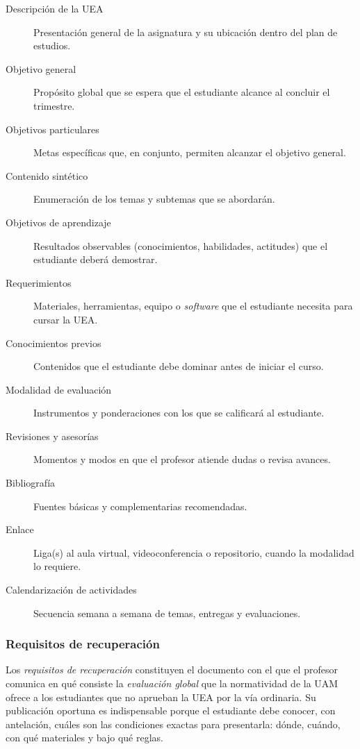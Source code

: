 \begin{description}
    \item[Descripción de la UEA] Presentación general de la asignatura y su ubicación dentro del plan de estudios.
    \item[Objetivo general] Propósito global que se espera que el estudiante alcance al concluir el trimestre.
    \item[Objetivos particulares] Metas específicas que, en conjunto, permiten alcanzar el objetivo general.
    \item[Contenido sintético] Enumeración de los temas y subtemas que se abordarán.
    \item[Objetivos de aprendizaje] Resultados observables (conocimientos, habilidades, actitudes) que el estudiante deberá demostrar.
    \item[Requerimientos] Materiales, herramientas, equipo o \emph{software} que el estudiante necesita para cursar la UEA.
    \item[Conocimientos previos] Contenidos que el estudiante debe dominar antes de iniciar el curso.
    \item[Modalidad de evaluación] Instrumentos y ponderaciones con los que se calificará al estudiante.
    \item[Revisiones y asesorías] Momentos y modos en que el profesor atiende dudas o revisa avances.
    \item[Bibliografía] Fuentes básicas y complementarias recomendadas.
    \item[Enlace] Liga(s) al aula virtual, videoconferencia o repositorio, cuando la modalidad lo requiere.
    \item[Calendarización de actividades] Secuencia semana a semana de temas, entregas y evaluaciones.
\end{description}

\subsubsection*{Requisitos de recuperación}

Los \emph{requisitos de recuperación} constituyen el documento con el que el profesor comunica en qué consiste la \emph{evaluación global} que la normatividad de la UAM ofrece a los estudiantes que no aprueban la UEA por la vía ordinaria. Su publicación oportuna es indispensable porque el estudiante debe conocer, con antelación, cuáles son las condiciones exactas para presentarla: dónde, cuándo, con qué materiales y bajo qué reglas.


